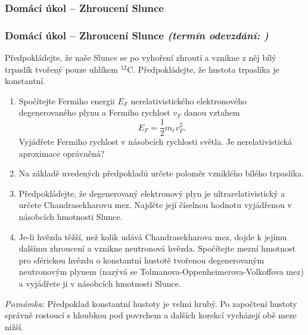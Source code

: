\documentclass[a4paper,11pt,twoside]{article}
\newenvironment{homework}{}{}
\newcommand{\np}{\clearpage\newpage}
\newcommand{\exercise}[2][]{\ifthenelse{\isempty{#1}}
	{\np\thispagestyle{empty}\subsubsection*{Domácí úkol -- #2}}
	{\np\thispagestyle{empty}\np\subsubsection*{Domácí úkol -- #2 \small{\it{(termín odevzdání: {#1})}}}}
}
\begin{document}
\begin{homework}
	\exercise{Zhroucení Slunce}
		Předpokládejte, že naše Slunce se po vyhoření zhroutí a vznikne z něj bílý trpaslík tvořený pouze uhlíkem $^{12}\mathrm{C}$.  
		Předpokládejte, že hustota trpaslíka je konstantní.

		\begin{enumerate}
			\item Spočítejte Fermiho energii $E_{F}$ nerelativistického elektronového degenerovaného plynu a Fermiho rychlost $v_{F}$ danou vztahem
			\begin{equation*}
				E_{F}=\frac{1}{2}m_{e}v_{F}^{2}.
			\end{equation*}
			Vyjádřete Fermiho rychlost v násobcích rychlosti světla.
			Je nerelativistická aproximace oprávněná?
			
			\item Na základě uvedených předpokladů určete poloměr vzniklého bílého trpaslíka.

			\item Předpokládejte, že degenerovaný elektronový plyn je ultrarelativistický a určete Chandrasekharovu mez.
				Najděte její číselnou hodnotu vyjádřenou v násobcích hmotnosti Slunce.
			
			\item Je-li hvězda těžší, než kolik udává Chandrasekharova mez, dojde k jejímu dalšímu zhroucení a vznikne neutronová hvězda.
			Spočítejte mezní hmotnost pro sférickou hvězdu o konstantní hustotě tvořenou degenerovaným neutronovým plynem (nazývá se Tolmanova-Oppenheimerova-Volkoffova mez) a vyjádřete ji v násobcích hmotnosti Slunce.
		\end{enumerate}

		{\it Poznámka:} Předpoklad konstantní hustoty je velmi hrubý. 
		Po započtení hustoty správně rostoucí s hloubkou pod povrchem a dalších korekcí vycházejí obě meze nižší.

		\newpage
\end{homework}
\end{document}
